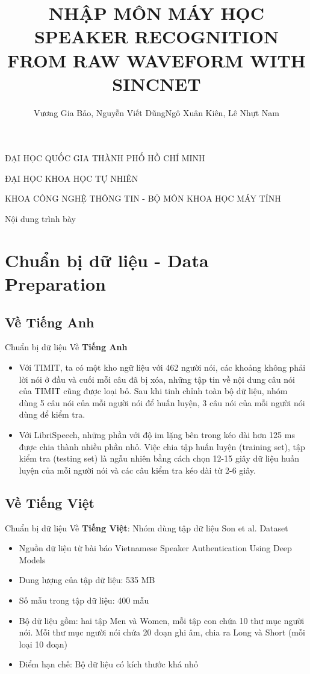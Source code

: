 \documentclass[notheorems, aspectratio=54]{beamer}
\author{Vương Gia Bảo, Nguyễn Viết Dũng\newline Ngô Xuân Kiên, Lê Nhựt Nam}
\title{NHẬP MÔN MÁY HỌC \newline SPEAKER RECOGNITION FROM \newline RAW WAVEFORM WITH SINCNET}
\begin{document}
\begin{frame}
	\centering
	ĐẠI HỌC QUỐC GIA THÀNH PHỐ HỒ CHÍ MINH
	
	ĐẠI HỌC KHOA HỌC TỰ NHIÊN
	
	KHOA CÔNG NGHỆ THÔNG TIN - BỘ MÔN KHOA HỌC MÁY TÍNH
	\titlepage
\end{frame}

\begin{frame}{Nội dung trình bày}
\tableofcontents
\end{frame}
\section{Chuẩn bị dữ liệu - Data Preparation}
\subsection{Về \textbf{Tiếng Anh}}
\begin{frame}{Chuẩn bị dữ liệu}
	Về \textbf{Tiếng Anh}
	\begin{itemize}
		\item Với TIMIT, ta có một kho ngữ liệu với 462 người nói, các khoảng không phải lời nói ở đầu và cuối mỗi câu đã bị xóa, những tập tin về nội dung câu nói của TIMIT cũng được loại bỏ. Sau khi tinh chỉnh toàn bộ dữ liệu, nhóm dùng 5 câu nói của mỗi người nói để huấn luyện, 3 câu nói của mỗi người nói dùng để kiểm tra.
		\item Với LibriSpeech, những phần với độ im lặng bên trong kéo dài hơn 125 ms được
		chia thành nhiều phần nhỏ. Việc chia tập huấn luyện (training set), tập kiểm tra (testing set) là ngẫu nhiên bằng cách chọn 12-15 giây dữ liệu huấn luyện của mỗi người nói và các câu kiểm tra kéo dài từ 2-6 giây.
	\end{itemize}
\end{frame}
\subsection{Về \textbf{Tiếng Việt}}
\begin{frame}{Chuẩn bị dữ liệu}
	Về \textbf{Tiếng Việt}: Nhóm dùng tập dữ liệu Son et al. Dataset
	\begin{itemize}
		\item Nguồn dữ liệu từ bài báo Vietnamese Speaker Authentication Using Deep Models
		\item Dung lượng của tập dữ liệu: 535 MB
		\item Số mẫu trong tập dữ liệu: 400 mẫu
		\item Bộ dữ liệu gồm: hai tập Men và Women, mỗi tập con chứa 10 thư mục người nói. Mỗi thư mục người nói chứa 20 đoạn ghi âm, chia ra Long và Short (mỗi loại 10 đoạn)
		\item Điểm hạn chế: Bộ dữ liệu có kích thước khá nhỏ
	\end{itemize}
\end{frame}
\end{document}
